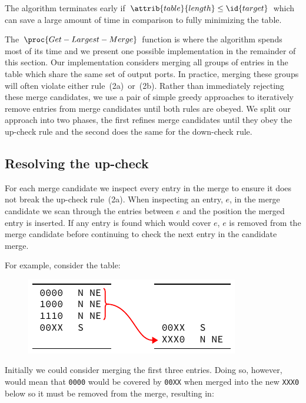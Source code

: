 \documentclass[conference]{IEEEtran}
\newcommand{\mytt}[1]{\texttt{\footnotesize#1}}
\begin{document}
  The algorithm terminates early if $\attrib{table}{length} \le \id{target}$ which can save a large amount of time in comparison to fully minimizing the table.

  The $\proc{Get-Largest-Merge}$ function is where the algorithm spends most of its time and we present one possible implementation in the remainder of this section.
  Our implementation considers merging all groups of entries in the table which share the same set of output ports.
  In practice, merging these groups will often violate either rule~(2a)~or~(2b).
  Rather than immediately rejecting these merge candidates, we use a pair of simple greedy approaches to iteratively remove entries from merge candidates until both rules are obeyed.
  We split our approach into two phases, the first refines merge candidates until they obey the up-check rule and the second does the same for the down-check rule.

  \subsection{Resolving the up-check}

  For each merge candidate we inspect every entry in the merge to ensure it does not break the up-check rule~(2a).
  When inspecting an entry, $e$, in the merge candidate we scan through the entries between $e$ and the position the merged entry is inserted.
  If any entry is found which would cover $e$, $e$ is removed from the merge candidate before continuing to check the next entry in the candidate merge.

  For example, consider the table:

  \begin{figure}[H]
    \centering
    \includegraphics{figures/upcheck_resolve_example_1}
  \end{figure}

  \noindent Initially we could consider merging the first three entries.
  Doing so, however, would mean that \mytt{0000} would be covered by \mytt{00XX} when merged into the new \mytt{XXX0} below so it must be removed from the merge, resulting in:
\end{document}
